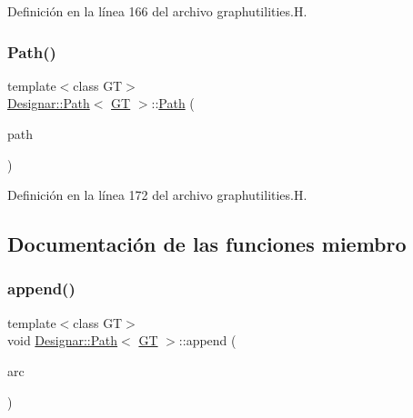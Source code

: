 Definición en la línea 166 del archivo graphutilities.\+H.

\mbox{\label{class_designar_1_1_path_a873d668006017c410e6808ffb162ceb8}} 
\subsubsection{\texorpdfstring{Path()}{Path()}\hspace{0.1cm}{\footnotesize\ttfamily [4/4]}}
{\footnotesize\ttfamily template$<$class GT$>$ \\
\hyperlink{class_designar_1_1_path}{Designar\+::\+Path}$<$ \hyperlink{demo-buildgraph_8_c_a3001c40d2c31ca87ed96cd7d1334a55e}{GT} $>$\+::\hyperlink{class_designar_1_1_path}{Path} (\begin{DoxyParamCaption}\item[{\hyperlink{class_designar_1_1_path}{Path}$<$ \hyperlink{demo-buildgraph_8_c_a3001c40d2c31ca87ed96cd7d1334a55e}{GT} $>$ \&\&}]{path }\end{DoxyParamCaption})\hspace{0.3cm}{\ttfamily [inline]}}



Definición en la línea 172 del archivo graphutilities.\+H.



\subsection{Documentación de las funciones miembro}
\mbox{\label{class_designar_1_1_path_a985717f0848469b05dfc8172eb483ad4}} 
\subsubsection{\texorpdfstring{append()}{append()}\hspace{0.1cm}{\footnotesize\ttfamily [1/2]}}
{\footnotesize\ttfamily template$<$class GT$>$ \\
void \hyperlink{class_designar_1_1_path}{Designar\+::\+Path}$<$ \hyperlink{demo-buildgraph_8_c_a3001c40d2c31ca87ed96cd7d1334a55e}{GT} $>$\+::append (\begin{DoxyParamCaption}\item[{\hyperlink{class_designar_1_1_path_a6e13966351659cedcf3233098b2b7384}{Arc\+Type} \&}]{arc }\end{DoxyParamCaption})\hspace{0.3cm}{\ttfamily [inline]}}



